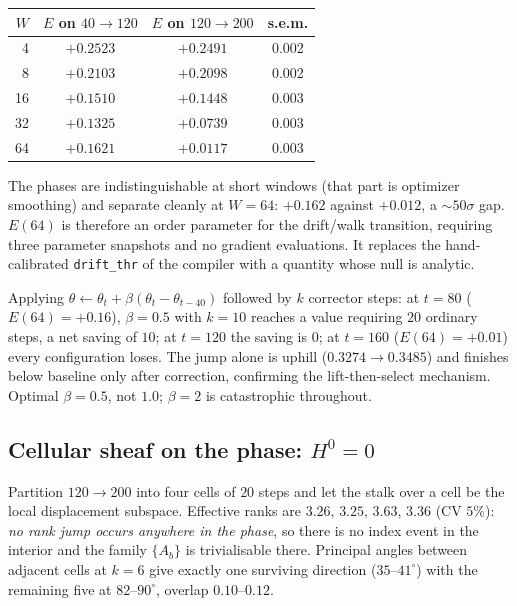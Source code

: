 \begin{center}
\begin{tabular}{rccc}
\toprule
$W$ & $E$ on $40\to120$ & $E$ on $120\to200$ & s.e.m. \\
\midrule
4  & $+0.2523$ & $+0.2491$ & 0.002 \\
8  & $+0.2103$ & $+0.2098$ & 0.002 \\
16 & $+0.1510$ & $+0.1448$ & 0.003 \\
32 & $+0.1325$ & $+0.0739$ & 0.003 \\
64 & $+0.1621$ & $+0.0117$ & 0.003 \\
\bottomrule
\end{tabular}
\end{center}

The phases are indistinguishable at short windows (that part is optimizer
smoothing) and separate cleanly at $W=64$: $+0.162$ against $+0.012$, a
$\sim 50\sigma$ gap. $E(64)$ is therefore an order parameter for the
drift/walk transition, requiring three parameter snapshots and no gradient
evaluations. It replaces the hand-calibrated \texttt{drift\_thr} of the
compiler with a quantity whose null is analytic.

\begin{observation}
Applying $\theta \leftarrow \theta_t + \beta(\theta_t - \theta_{t-40})$
followed by $k$ corrector steps: at $t=80$ ($E(64)=+0.16$), $\beta=0.5$ with
$k=10$ reaches a value requiring $20$ ordinary steps, a net saving of $10$;
at $t=120$ the saving is $0$; at $t=160$ ($E(64)=+0.01$) every configuration
loses. The jump alone is uphill ($0.3274 \to 0.3485$) and finishes below
baseline only after correction, confirming the lift-then-select mechanism.
Optimal $\beta = 0.5$, not $1.0$; $\beta = 2$ is catastrophic throughout.
\end{observation}

\subsection{Cellular sheaf on the phase: \texorpdfstring{$H^0=0$}{H0=0}}

Partition $120\to200$ into four cells of $20$ steps and let the stalk over a
cell be the local displacement subspace. Effective ranks are
$3.26,\,3.25,\,3.63,\,3.36$ (CV $5\%$): \emph{no rank jump occurs anywhere in
the phase}, so there is no index event in the interior and the family
$\{A_b\}$ is trivialisable there. Principal angles between adjacent cells at
$k=6$ give exactly one surviving direction ($35$--$41^\circ$) with the
remaining five at $82$--$90^\circ$, overlap $0.10$--$0.12$.

